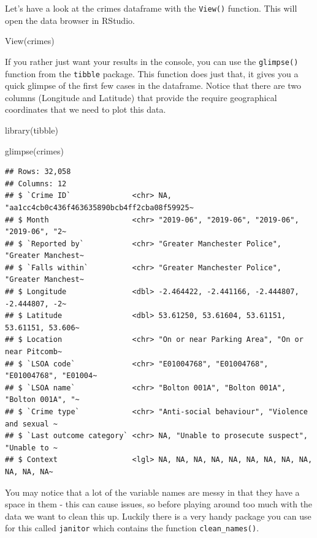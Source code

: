 \documentclass[
]{book}
\makeatletter
\newenvironment{Shaded}{\begin{snugshade}}{\end{snugshade}}
\newcommand{\FunctionTok}[1]{\textcolor[rgb]{0,0,0}{#1}}
\newcommand{\NormalTok}[1]{#1}
\newenvironment{kframe}{%
\medskip{}
\setlength{\fboxsep}{.8em}
 \def\at@end@of@kframe{}%
 \ifinner\ifhmode%
  \def\at@end@of@kframe{\end{minipage}}%
  \begin{minipage}{\columnwidth}%
 \fi\fi%
 \def\FrameCommand##1{\hskip\@totalleftmargin \hskip-\fboxsep
 \colorbox{shadecolor}{##1}\hskip-\fboxsep
     \hskip-\linewidth \hskip-\@totalleftmargin \hskip\columnwidth}%
 \MakeFramed {\advance\hsize-\width
   \@totalleftmargin\z@ \linewidth\hsize
   \@setminipage}}%
 {\par\unskip\endMakeFramed%
 \at@end@of@kframe}
\renewenvironment{Shaded}{\begin{kframe}}{\end{kframe}}
\makeatother
\begin{document}
Let's have a look at the crimes dataframe with the \texttt{View()} function. This will open the data browser in RStudio.

\begin{Shaded}
\begin{Highlighting}[]
\FunctionTok{View}\NormalTok{(crimes)}
\end{Highlighting}
\end{Shaded}

If you rather just want your results in the console, you can use the \texttt{glimpse()} function from the \texttt{tibble} package. This function does just that, it gives you a quick glimpse of the first few cases in the dataframe. Notice that there are two columns (Longitude and Latitude) that provide the require geographical coordinates that we need to plot this data.

\begin{Shaded}
\begin{Highlighting}[]
\FunctionTok{library}\NormalTok{(tibble)}

\FunctionTok{glimpse}\NormalTok{(crimes)}
\end{Highlighting}
\end{Shaded}

\begin{verbatim}
## Rows: 32,058
## Columns: 12
## $ `Crime ID`              <chr> NA, "aa1cc4cb0c436f463635890bcb4ff2cba08f59925~
## $ Month                   <chr> "2019-06", "2019-06", "2019-06", "2019-06", "2~
## $ `Reported by`           <chr> "Greater Manchester Police", "Greater Manchest~
## $ `Falls within`          <chr> "Greater Manchester Police", "Greater Manchest~
## $ Longitude               <dbl> -2.464422, -2.441166, -2.444807, -2.444807, -2~
## $ Latitude                <dbl> 53.61250, 53.61604, 53.61151, 53.61151, 53.606~
## $ Location                <chr> "On or near Parking Area", "On or near Pitcomb~
## $ `LSOA code`             <chr> "E01004768", "E01004768", "E01004768", "E01004~
## $ `LSOA name`             <chr> "Bolton 001A", "Bolton 001A", "Bolton 001A", "~
## $ `Crime type`            <chr> "Anti-social behaviour", "Violence and sexual ~
## $ `Last outcome category` <chr> NA, "Unable to prosecute suspect", "Unable to ~
## $ Context                 <lgl> NA, NA, NA, NA, NA, NA, NA, NA, NA, NA, NA, NA~
\end{verbatim}

You may notice that a lot of the variable names are messy in that they have a space in them - this can cause issues, so before playing around too much with the data we want to clean this up. Luckily there is a very handy package you can use for this called \texttt{janitor} which contains the function \texttt{clean\_names()}.
\end{document}
